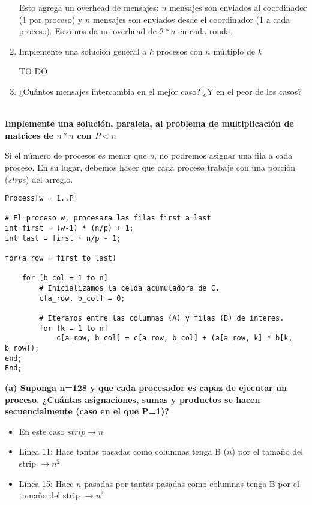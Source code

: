 \documentclass[a4paper, 10pt]{article}
\newenvironment{QandA}{
    \begin{enumerate}\bfseries}
    {\end{enumerate}
}
\newenvironment{answered}{\par\normalfont}{}
\begin{document}
\begin{QandA}
\begin{enumerate}
\begin{answered}
Esto agrega un overhead de mensajes: $n$ mensajes son enviados al coordinador (1 por proceso) y $n$ mensajes son enviados desde el coordinador (1 a cada proceso). Esto nos da un overhead de $2*n$ en cada ronda.
\end{answered}
\item Implemente una solución general a $k$ procesos con $n$ múltiplo de $k$
\begin{answered}
    TO DO
\end{answered}
\item ¿Cuántos mensajes intercambia en el mejor caso? ¿Y en el peor de los casos?
\end{enumerate}


{\large \textbf{\\Implemente una solución, paralela, al problema de multiplicación de matrices de $n*n$ con $P<n$}}

Si el número de procesos es menor que \emph{n}, no podremos asignar una fila a cada proceso. En su lugar, debemos hacer que cada proceso trabaje con una porción (\emph{strpe}) del arreglo.

\begin{lstlisting}
Process[w = 1..P]

# El proceso w, procesara las filas first a last
int first = (w-1) * (n/p) + 1;
int last = first + n/p - 1;

for(a_row = first to last)

    for [b_col = 1 to n]
        # Inicializamos la celda acumuladora de C.
        c[a_row, b_col] = 0;

        # Iteramos entre las columnas (A) y filas (B) de interes.
        for [k = 1 to n]
            c[a_row, b_col] = c[a_row, b_col] + (a[a_row, k] * b[k, b_row]);
end;
End;
\end{lstlisting}

\textbf{(a) Suponga n=128 y que cada procesador es capaz de ejecutar un proceso. ¿Cuántas asignaciones, sumas y productos se hacen secuencialmente (caso en el que P=1)?}

\begin{itemize}
    \item En este caso $strip \rightarrow n$
    \item Línea 11: Hace tantas pasadas como columnas tenga B ($n$) por el tamaño del strip $\rightarrow n^2$
    \item Línea 15: Hace $n$ pasadas por tantas pasadas como columnas tenga B por el tamaño del strip $\rightarrow n^3$
\end{itemize}


\end{QandA}
\end{document}
